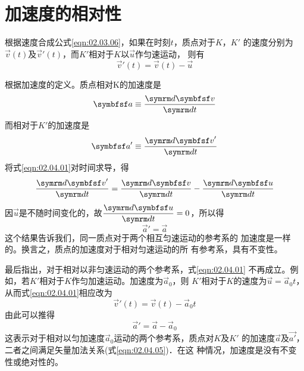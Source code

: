 \section{加速度的相对性}\label{sec:02.04}

根据速度合成公式\eqref{eqn:02.03.06}，如果在时刻$t$，质点对于$K$，$K'$
的速度分别为$\vec{v}\left(t\right)$及$\vec{v}'\left(t\right)$，而$K'$相对于$K$以$\vec{u}$作匀速运动，
则有
\begin{equation}\label{eqn:02.04.01}
  \vec{v}'\left(t\right)=\vec{v}\left(t\right)-\vec{u}
\end{equation}

\clearpage\noindent
根据加速度的定义。质点相对K的加速度是
\begin{equation}\label{eqn:02.04.02}
  \vec{a}\equiv\frac{\dif \vec{v}}{\dif t}
\end{equation}
而相对于$K'$的加速度是
\begin{equation}\label{eqn:02.04.03}
  \vec{a}'\equiv\frac{\dif \vec{v}'}{\dif t}
\end{equation}
将式\eqref{eqn:02.04.01}对时间求导，得
\begin{equation}
  \frac{\dif \vec{v}'}{\dif t}=\frac{\dif \vec{v}}{\dif t}-\frac{\dif \vec{u}}{\dif t}
\end{equation}
因$ \vec{u} $是不随时间变化的，故$\dfrac{\dif \vec{u}}{\dif t}=0$，所以得
\begin{equation}\label{eqn:02.04.04}
  \vec{a}'=\vec{a}
\end{equation}
这个结果告诉我们，同一质点对于两个相互匀速运动的参考系的
加速度是一样的。换言之，质点的加速度对于相对匀速运动的所
有参考系，具有不变性。

最后指出，对于相对以非匀速运动的两个参考系，式\eqref{eqn:02.04.01}
不再成立。例如，若$K'$相对于$K$作匀加速运动。加速度为$\vec{a}_0$，则
$K'$相对于$K$的速度为$\vec{u}=\vec{a}_0t$，从而式\eqref{eqn:02.04.01}相应改为
\begin{equation*}
  \vec{v}'\left(t\right)=\vec{v}\left(t\right)-\vec{a}_0t
\end{equation*}
由此可以推得
\begin{equation}\label{eqn:02.04.05}
  \vec{a}'=\vec{a} - \vec{a}_0
\end{equation}
这表示对于相对以匀加速度$\vec{a}_0$运动的两个参考系，质点对$K$及$K'$
的加速度$\vec{a}$及$\vec{a'}$，二者之间满足矢量加法关系(式\eqref{eqn:02.04.05})．在这
种情况，加速度是没有不变性或绝对性的。

